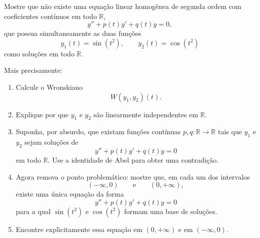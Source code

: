 \documentclass[a4paper,11pt,reqno]{amsart}
\begin{document}
\begin{enumerate}
Mostre que não existe uma equação linear homogênea de segunda ordem com coeficientes contínuos em todo $\mathbb{R}$,
\[
    y''+p(t)y'+q(t)y=0,
\]
que possua simultaneamente as duas funções
\[
    y_1(t)=\sin(t^2),
    \qquad
    y_2(t)=\cos(t^2)
\]
como soluções em todo $\mathbb{R}$.

Mais precisamente:

\begin{enumerate}
    \item Calcule o Wronskiano
    \[
        W(y_1,y_2)(t).
    \]

    \item Explique por que $y_1$ e $y_2$ são linearmente independentes em $\mathbb{R}$.

    \item Suponha, por absurdo, que existam funções contínuas $p,q:\mathbb{R}\to\mathbb{R}$ tais que $y_1$ e $y_2$ sejam soluções de
    \[
        y''+p(t)y'+q(t)y=0
    \]
    em todo $\mathbb{R}$. Use a identidade de Abel para obter uma contradição.

    \item Agora remova o ponto problemático: mostre que, em cada um dos intervalos
    \[
        (-\infty,0)
        \qquad\text{e}\qquad
        (0,+\infty),
    \]
    existe uma única equação da forma
    \[
        y''+p(t)y'+q(t)y=0
    \]
    para a qual $\sin(t^2)$ e $\cos(t^2)$ formam uma base de soluções.

    \item Encontre explicitamente essa equação em $(0,+\infty)$ e em $(-\infty,0)$.
\end{enumerate}

\end{enumerate}
\end{document}
